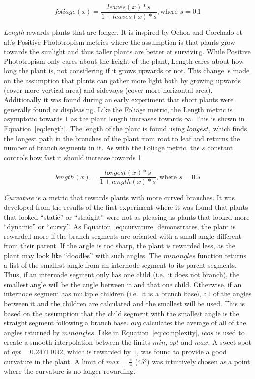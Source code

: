 \begin{equation}
\label{eq:foliage}
    foliage(x) = \frac{leaves(x) * s}{1 + leaves(x) * s}, \text{where } s = 0.1
\end{equation}

\textit{Length} rewards plants that are longer.
It is inspired by Ochoa and Corchado et al.'s Positive Phototropism metrics where the assumption is that plants grow towards the sunlight and thus taller plants are better at surviving.
While Positive Phototropism only cares about the height of the plant, Length cares about how long the plant is, not considering if it grows upwards or not.
This change is made on the assumption that plants can gather more light both by growing upwards (cover more vertical area) and sideways (cover more horizontal area).
Additionally it was found during an early experiment that short plants were generally found as displeasing.
Like the Foliage metric, the Length metric is asymptotic towards 1 as the plant length increases towards $\infty$.
This is shown in Equation~\ref{eq:length}.
The length of the plant is found using $longest$, which finds the longest path in the branches of the plant from root to leaf and returns the number of branch segments in it.
As with the Foliage metric, the $s$ constant controls how fast it should increase towards 1.

\begin{equation}
\label{eq:length}
    length(x) = \frac{longest(x) * s}{1 + length(x) * s}, \text{where } s = 0.5
\end{equation}

\textit{Curvature} is a metric that rewards plants with more curved branches.
It was developed from the results of the first experiment where it was found that plants that looked ``static'' or ``straight'' were not as pleasing as plants that looked more ``dynamic'' or ``curvy''.
As Equation~\ref{eq:curvature} demonstrates, the plant is rewarded more if the branch segments are oriented with a small angle different from their parent.
If the angle is too sharp, the plant is rewarded less, as the plant may look like ``doodles'' with such angles.
The $minangles$ function returns a list of the smallest angle from an internode segment to its parent segments.
Thus, if an internode segment only has one child (i.e.\ it does not branch), the smallest angle will be the angle between it and that one child.
Otherwise, if an internode segment has multiple children (i.e.\ it is a branch base), all of the angles between it and the children are calculated and the smallest will be used.
This is based on the assumption that the child segment with the smallest angle is the straight segment following a branch base.
$avg$ calculates the average of all of the angles returned by $minangles$.
Like in Equation~\ref{eq:complexity}, $icos$ is used to create a smooth interpolation between the limits $min$, $opt$ and $max$.
A sweet spot of $opt = 0.24711092$, which is rewarded by 1, was found to provide a good curvature in the plant.
A limit of $max = \frac{\pi}{4}$ (45°) was intuitively chosen as a point where the curvature is no longer rewarding.

